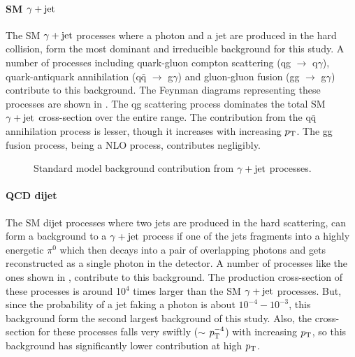 \paragraph {\bf{SM $\gamma+\mathrm{jet}$}}
\hspace{\parindent} The SM $\gamma+\mathrm{jet}$ processes where a photon and a jet are produced in the hard collision, form the most dominant and irreducible
background for this study. A number of processes including quark-gluon compton scattering (qg $\rightarrow$ q$\gamma$), quark-antiquark annihilation (q$\bar{\textrm{q}}$
$\rightarrow$ g$\gamma$) and gluon-gluon fusion (gg $\rightarrow$ g$\gamma$) contribute to this background. The Feynman diagrams
representing these processes are shown in \fig{\ref{fig:GJ_Bkg}}. The qg scattering process dominates the total SM $\gamma+\mathrm{jet}$ cross-section over the entire \pt range.
The contribution from the q$\bar{\textrm{q}}$ annihilation process is lesser, though it increases with increasing $p_{\mathrm T}$. The gg fusion process, being a NLO process,
contributes negligibly. 

\vspace{-0.2in}
\begin{figure}[h!]
\centering
{}
 \hspace{0.5cm}
 \hspace{0.5cm}
 \caption{Standard model background contribution from $\gamma+\mathrm{jet}$ processes.}
\label{fig:GJ_Bkg}
\end{figure}
\paragraph {\bf{QCD dijet}}
\hspace{\parindent} The SM dijet processes where two jets are produced in the hard scattering, can form a background to a $\gamma+\mathrm{jet}$ process if one of the jets fragments
into a highly energetic $\pi^{0}$ which then decays into a pair of overlapping photons and gets reconstructed as a single photon in the detector.
A number of processes like the ones shown in \fig{\ref{fig:QCDDijet_bkg}}, contribute to this background.
The production cross-section of these processes is around 10$^{4}$ times larger than the SM $\gamma+\mathrm{jet}$ processes. But, since the probability of a jet faking a photon
is about $10^{-4} - 10^{-3}$, this background form the second largest background of this study. Also, the cross-section for these processes falls very swiftly
($\sim$ $p_{\mathrm T}^{-4}$) with increasing $p_{\mathrm T}$, so this background has significantly lower contribution at high $p_{\mathrm T}$.

